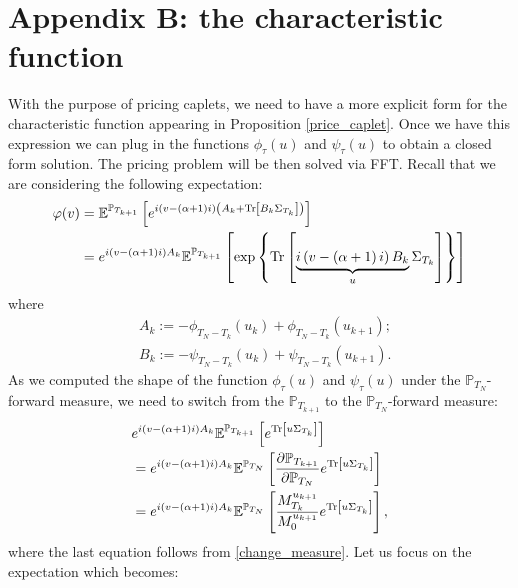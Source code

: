 \section*{Appendix B: the characteristic function}
With the purpose of pricing caplets, we need to have a more explicit form for the characteristic function appearing in Proposition \ref{price_caplet}. Once we have this expression we can plug in the functions $\phi_{\tau}(u)$ and $\psi_{\tau}(u)$ to obtain a closed form solution. The pricing problem will be then solved via FFT. Recall that we are considering the following expectation:
\begin{align}
\varphi(v)&=\mathbb{E}^{\mathbb{P}_{T_{k+1}}}\left[e^{i\left( v-\left(\alpha +1 \right)i\right)\left(A_{k}+\textup{Tr}\left[B_{k}\Sigma_{T_{k}}\right]\right)}\right]\nonumber\\
&=e^{i\left( v-\left(\alpha +1 \right)i\right)A_{k}}\mathbb{E}^{\mathbb{P}_{T_{k+1}}}\left[\exp\left\{\textup{Tr}\left[\underbrace{i\left( v-\left(\alpha +1 \right)i\right) B_{k}}_{u}\Sigma_{T_{k}}\right]\right\}\right]
\end{align}
where
\begin{align}
&A_{k}:=-\phi_{T_{N}-T_{k}}(u_{k})+\phi_{T_{N}-T_{k}}(u_{k+1});\nonumber\\
&B_{k}:=-\psi_{T_{N}-T_{k}}(u_{k})+\psi_{T_{N}-T_{k}}(u_{k+1}).
\end{align}
As we computed the shape of the function $\phi_{\tau}(u)$ and $\psi_{\tau}(u)$ under the $\mathbb{P}_{T_{N}}$-forward measure, we need to switch from the $\mathbb{P}_{T_{k+1}}$ to the $\mathbb{P}_{T_{N}}$-forward measure:
\begin{align}
&e^{i\left( v-\left(\alpha +1 \right)i\right)A_{k}}\mathbb{E}^{\mathbb{P}_{T_{k+1}}}\left[e^{\textup{Tr}\left[u\Sigma_{T_{k}}\right]}\right]\nonumber\\
&=e^{i\left( v-\left(\alpha +1 \right)i\right)A_{k}}\mathbb{E}^{\mathbb{P}_{T_{N}}}\left[\frac{\partial \mathbb{P}_{T_{k+1}}}{\partial \mathbb{P}_{T_{N}}}e^{\textup{Tr}\left[u\Sigma_{T_{k}}\right]}\right]\nonumber\\
&=e^{i\left( v-\left(\alpha +1 \right)i\right)A_{k}}\mathbb{E}^{\mathbb{P}_{T_{N}}}\left[\frac{M^{u_{k+1}}_{T_k}}{M^{u_{k+1}}_{0}}e^{\textup{Tr}\left[u\Sigma_{T_{k}}\right]}\right],\label{8.3}
\end{align}
where the last equation follows from \eqref{change_measure}. Let us focus on the expectation which becomes:
